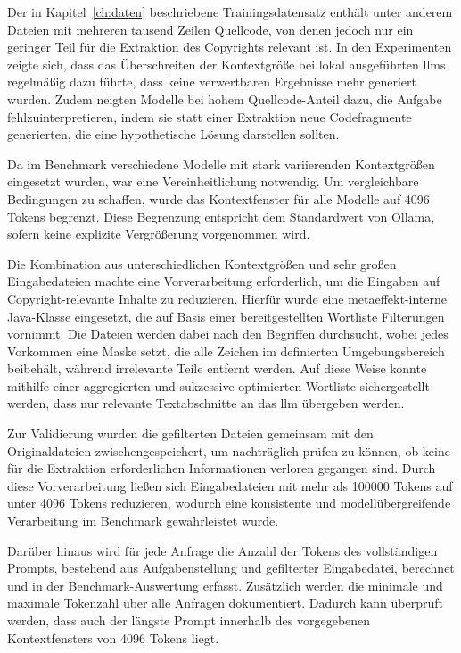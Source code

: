 Der in Kapitel~\ref{ch:daten} beschriebene Trainingsdatensatz enthält unter anderem Dateien mit mehreren tausend Zeilen Quellcode, von denen jedoch nur ein geringer Teil für die Extraktion des Copyrights relevant ist.
In den Experimenten zeigte sich, dass das Überschreiten der Kontextgröße bei lokal ausgeführten \glspl{llm} regelmäßig dazu führte, dass keine verwertbaren Ergebnisse mehr generiert wurden.
Zudem neigten Modelle bei hohem Quellcode-Anteil dazu, die Aufgabe fehlzuinterpretieren, indem sie statt einer Extraktion neue Codefragmente generierten, die eine hypothetische Lösung darstellen sollten.

Da im Benchmark verschiedene Modelle mit stark variierenden Kontextgrößen eingesetzt wurden, war eine Vereinheitlichung notwendig.
Um vergleichbare Bedingungen zu schaffen, wurde das Kontextfenster für alle Modelle auf \num{4096} Tokens begrenzt.
Diese Begrenzung entspricht dem Standardwert von Ollama, sofern keine explizite Vergrößerung vorgenommen wird.

Die Kombination aus unterschiedlichen Kontextgrößen und sehr großen Eingabedateien machte eine Vorverarbeitung erforderlich, um die Eingaben auf Copyright-relevante Inhalte zu reduzieren.
Hierfür wurde eine metaeffekt-interne Java-Klasse eingesetzt, die auf Basis einer bereitgestellten Wortliste Filterungen vornimmt.
Die Dateien werden dabei nach den Begriffen durchsucht, wobei jedes Vorkommen eine Maske setzt, die alle Zeichen im definierten Umgebungsbereich beibehält, während irrelevante Teile entfernt werden.
Auf diese Weise konnte mithilfe einer aggregierten und sukzessive optimierten Wortliste sichergestellt werden, dass nur relevante Textabschnitte an das \gls{llm} übergeben werden.

Zur Validierung wurden die gefilterten Dateien gemeinsam mit den Originaldateien zwischengespeichert, um nachträglich prüfen zu können, ob keine für die Extraktion erforderlichen Informationen verloren gegangen sind.
Durch diese Vorverarbeitung ließen sich Eingabedateien mit mehr als \num{100000} Tokens auf unter \num{4096} Tokens reduzieren, wodurch eine konsistente und modellübergreifende Verarbeitung im Benchmark gewährleistet wurde.

Darüber hinaus wird für jede Anfrage die Anzahl der Tokens des vollständigen Prompts, bestehend aus Aufgabenstellung und gefilterter Eingabedatei, berechnet und in der Benchmark-Auswertung erfasst.
Zusätzlich werden die minimale und maximale Tokenzahl über alle Anfragen dokumentiert.
Dadurch kann überprüft werden, dass auch der längste Prompt innerhalb des vorgegebenen Kontextfensters von \num{4096} Tokens liegt.

